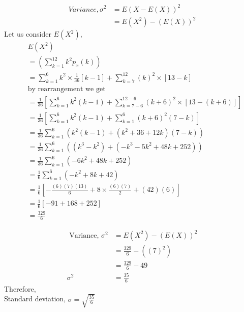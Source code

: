 \documentclass[journal,12pt,twocolumn]{IEEEtran}
\begin{document}
\begin{align}
  Variance,\sigma^2 &= E(X-E(X))^2 \\
    &= E(X^2) - (E(X))^2
\end{align}
Let us consider $E(X^2)$,
\begin{align}
    & E(X^2)\\
    &= \left(\sum_{k=1}^{12}k^2p_x(k)\right)\\
    &= \sum_{k=1}^{6}k^2\times\frac{1}{36}[k-1] + 
    \sum_{k=7}^{12}(k)^2\times[13-k]\\
    &\text{by rearrangement we get}\\
    &= \frac{1}{36}\left[\sum_{k=1}^{6}k^2(k-1) + \sum_{k=7-6}^{12-6}(k+6)^2\times[13-(k+6)]\right]\\
    &= \frac{1}{36}\left[\sum_{k=1}^{6}k^2(k-1) + \sum_{k=1}^{6}(k+6)^2(7-k)\right]\\
    &= \frac{1}{36}\sum_{k=1}^{6}\left(k^2(k-1) + (k^2+36+12k)(7-k)\right)\\
    &= \frac{1}{36}\sum_{k=1}^{6}\left((k^3-k^2) + (-k^3-5k^2+48k+252)\right)\\
    &= \frac{1}{36}\sum_{k=1}^{6}(-6k^2+48k+252)\\
    &= \frac{1}{6}\sum_{k=1}^{6}(-k^2+8k+42)\\
    &= \frac{1}{6}\left[ -\frac{(6)(7)(13)}{6} + 8\times\frac{(6)(7)}{2}+ (42)(6) \right]\\
    &= \frac{1}{6}[-91+168+252]\\
    &= \frac{329}{6}
\end{align}

\begin{align}
    \text{ Variance, }\sigma^2 &= E(X^2)-(E(X))^2\\
    &= \frac{329}{6}- ((7)^2)\\
    &= \frac{329}{6} - 49\\
   \sigma^2 &= \frac{35}{6}
\end{align}
Therefore,\\
Standard deviation, $\sigma=\sqrt{\frac{35}{6}}$
\end{document}
